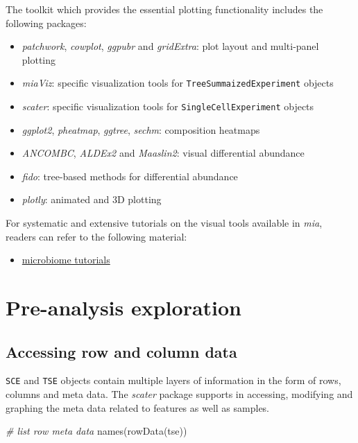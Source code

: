 \documentclass[
]{book}
\newenvironment{Shaded}{\begin{snugshade}}{\end{snugshade}}
\newcommand{\CommentTok}[1]{\textcolor[rgb]{0.56,0.35,0.01}{\textit{#1}}}
\newcommand{\FunctionTok}[1]{\textcolor[rgb]{0.00,0.00,0.00}{#1}}
\newcommand{\NormalTok}[1]{#1}
\providecommand{\tightlist}{%
  \setlength{\itemsep}{0pt}\setlength{\parskip}{0pt}}
\begin{document}
The toolkit which provides the essential plotting functionality includes the following packages:

\begin{itemize}
\tightlist
\item
  \emph{patchwork}, \emph{cowplot}, \emph{ggpubr} and \emph{gridExtra}: plot layout and multi-panel plotting
\item
  \emph{miaViz}: specific visualization tools for \texttt{TreeSummaizedExperiment} objects
\item
  \emph{scater}: specific visualization tools for \texttt{SingleCellExperiment} objects
\item
  \emph{ggplot2}, \emph{pheatmap}, \emph{ggtree}, \emph{sechm}: composition heatmaps
\item
  \emph{ANCOMBC}, \emph{ALDEx2} and \emph{Maaslin2}: visual differential abundance
\item
  \emph{fido}: tree-based methods for differential abundance
\item
  \emph{plotly}: animated and 3D plotting
\end{itemize}

For systematic and extensive tutorials on the visual tools available in \emph{mia}, readers can refer to the following material:

\begin{itemize}
\tightlist
\item
  \href{https://microbiome.github.io/tutorials/}{microbiome tutorials}
\end{itemize}

\hypertarget{pre-analysis-exploration}{%
\section{Pre-analysis exploration}\label{pre-analysis-exploration}}

\hypertarget{accessing-row-and-column-data}{%
\subsection{Accessing row and column data}\label{accessing-row-and-column-data}}

\texttt{SCE} and \texttt{TSE} objects contain multiple layers of information in the form of
rows, columns and meta data. The \emph{scater} package supports in accessing,
modifying and graphing the meta data related to features as well as samples.

\begin{Shaded}
\begin{Highlighting}[]
\CommentTok{\# list row meta data}
\FunctionTok{names}\NormalTok{(}\FunctionTok{rowData}\NormalTok{(tse))}
\end{Highlighting}
\end{Shaded}
\end{document}
